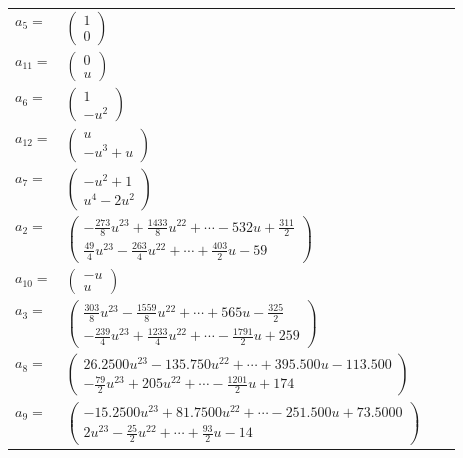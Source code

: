 \documentclass[1p]{elsarticle_modified}
\theoremstyle{definition}
\begin{document}
\begin{tabular}{m{7pt} m{180pt} m{7pt} m{180pt} }
\flushright $a_{5}=$&$\begin{pmatrix}1\\0\end{pmatrix}$ \\
\flushright $a_{11}=$&$\begin{pmatrix}0\\u\end{pmatrix}$ \\
\flushright $a_{6}=$&$\begin{pmatrix}1\\- u^2\end{pmatrix}$ \\
\flushright $a_{12}=$&$\begin{pmatrix}u\\- u^3+u\end{pmatrix}$ \\
\flushright $a_{7}=$&$\begin{pmatrix}- u^2+1\\u^4-2 u^2\end{pmatrix}$ \\
\flushright $a_{2}=$&$\begin{pmatrix}-\frac{273}{8} u^{23}+\frac{1433}{8} u^{22}+\cdots-532 u+\frac{311}{2}\\\frac{49}{4} u^{23}-\frac{263}{4} u^{22}+\cdots+\frac{403}{2} u-59\end{pmatrix}$ \\
\flushright $a_{10}=$&$\begin{pmatrix}- u\\u\end{pmatrix}$ \\
\flushright $a_{3}=$&$\begin{pmatrix}\frac{303}{8} u^{23}-\frac{1559}{8} u^{22}+\cdots+565 u-\frac{325}{2}\\-\frac{239}{4} u^{23}+\frac{1233}{4} u^{22}+\cdots-\frac{1791}{2} u+259\end{pmatrix}$ \\
\flushright $a_{8}=$&$\begin{pmatrix}26.2500 u^{23}-135.750 u^{22}+\cdots+395.500 u-113.500\\-\frac{79}{2} u^{23}+205 u^{22}+\cdots-\frac{1201}{2} u+174\end{pmatrix}$ \\
\flushright $a_{9}=$&$\begin{pmatrix}-15.2500 u^{23}+81.7500 u^{22}+\cdots-251.500 u+73.5000\\2 u^{23}-\frac{25}{2} u^{22}+\cdots+\frac{93}{2} u-14\end{pmatrix}$ \\

\end{tabular}
\end{document}
